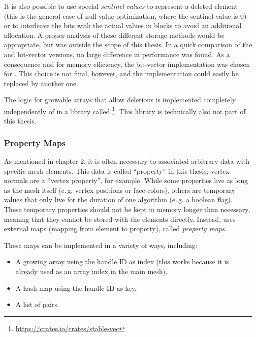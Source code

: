 It is also possible to use special \emph{sentinel values} to represent a deleted element (this is the general case of null-value optimization, where the sentinel value is 0) or to interleave the bits with the actual values in blocks to avoid an additional allocation.
A proper analysis of these different storage methods would be appropriate, but was outside the scope of this thesis.
In a quick comparison of the  and bit-vector versions, no large difference in performance was found.
As a consequence and for memory efficiency, the bit-vector implementation was chosen for .
This choice is not final, however, and the implementation could easily be replaced by another one.

The logic for growable arrays that allow deletions is implemented completely independently of  in a library called \footnote{\url{https://crates.io/crates/stable-vec}}.
This library is technically also not part of this thesis.






\subsubsection*{Property Maps}

As mentioned in chapter 2, it is often necessary to associated arbitrary data with specific mesh elements.
This data is called \enquote{property} in this thesis; vertex normals are a \enquote{vertex property}, for example.
While some properties live as long as the mesh itself (e.\,g. vertex positions or face colors),  others are temporary values that only live for the duration of one algorithm (e.\,g. a boolean  flag).
These temporary properties should not be kept in memory longer than necessary, meaning that they cannot be stored with the elements directly.
Instead,  uses external maps (mapping from element to property), called \emph{property maps}.

These maps can be implemented in a variety of ways, including:

\begin{itemize}
\item A growing array using the handle ID as index (this works because it is already used as an array index in the main mesh).
\item A hash map using the handle ID as key.
\item A list of  pairs.
\end{itemize}

